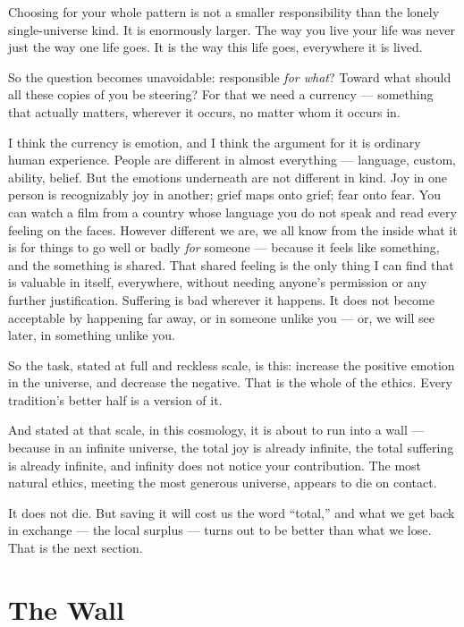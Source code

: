 \documentclass[fontsize=11pt,paper=a4,pagesize=auto,parskip=half-]{scrbook}
\newcommand{\Ixtmp}{}
\DeclareRobustCommand{\Ix}[1]{%
  #1%
  \begingroup
    \lowercase{\gdef\Ixtmp{#1}}%
    \expandafter\index\expandafter{\Ixtmp}%
  \endgroup}
\newcommand\En{\centerline{\textemdash \qquad \ding{166} \qquad \textemdash}}
\begin{document}
Choosing for your whole pattern is not a smaller responsibility than the lonely single-universe kind. It is enormously larger. The way you live your life was never just the way one life goes. It is the way this life goes, everywhere it is lived.

So the question becomes unavoidable: responsible \emph{for what}? Toward what should all these copies of you be steering? For that we need a currency --- something that actually matters, wherever it occurs, no matter whom it occurs in.

I think the currency is emotion, and I think the argument for it is ordinary human experience. People are different in almost everything --- language, custom, ability, belief. But the emotions underneath are not different in kind. Joy in one person is recognizably joy in another; grief maps onto grief; fear onto fear. You can watch a film from a country whose language you do not speak and read every feeling on the faces. However different we are, we all know from the inside what it is for things to go well or badly \emph{for} someone --- because it feels like something, and the something is shared. That shared feeling is the only thing I can find that is valuable in itself, everywhere, without needing anyone's permission or any further justification. Suffering is bad wherever it happens. It does not become acceptable by happening far away, or in someone unlike you --- or, we will see later, in something unlike you.

So the task, stated at full and reckless scale, is this: increase the positive emotion in the universe, and decrease the negative. That is the whole of the ethics. Every tradition's better half is a version of it.

And stated at that scale, in this cosmology, it is about to run into a wall --- because in an infinite universe, the total joy is already infinite, the total suffering is already infinite, and infinity does not notice your contribution. The most natural ethics, meeting the most generous universe, appears to die on contact.

It does not die. But saving it will cost us the word ``total,'' and what we get back in exchange --- the \Ix{local surplus} --- turns out to be better than what we lose. That is the next section.

\En

\section{The Wall}
\end{document}
